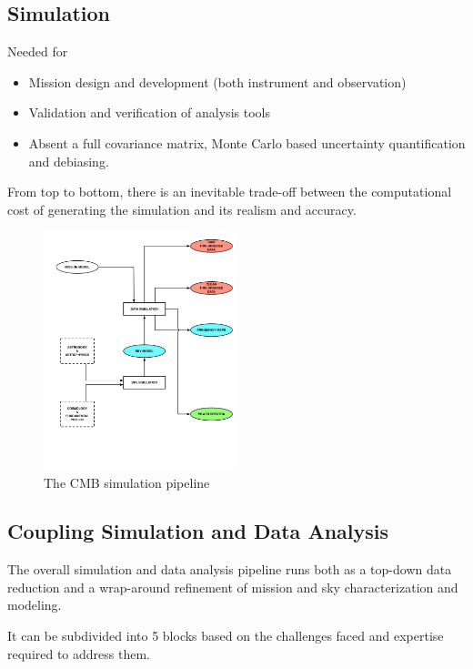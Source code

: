 \newpage

\subsection{Simulation}

Needed for 
\begin{itemize}
\item Mission design and development (both instrument and observation)
\item Validation and verification of analysis tools
\item Absent a full covariance matrix, Monte Carlo based uncertainty quantification and debiasing.
\end{itemize}

From top to bottom, there is an inevitable trade-off between the computational cost of generating the simulation and its realism and accuracy.

\begin{figure}[htbp]
\includegraphics[width=0.5\textwidth]{Analysis/sim}
\caption{The CMB simulation pipeline}
\label{default}

\end{figure}

\newpage

\subsection{Coupling Simulation and Data Analysis}

The overall simulation and data analysis pipeline runs both as a top-down data reduction and a wrap-around refinement of mission and sky characterization and modeling.

It can be subdivided into 5 blocks based on the challenges faced and expertise required to address them.

